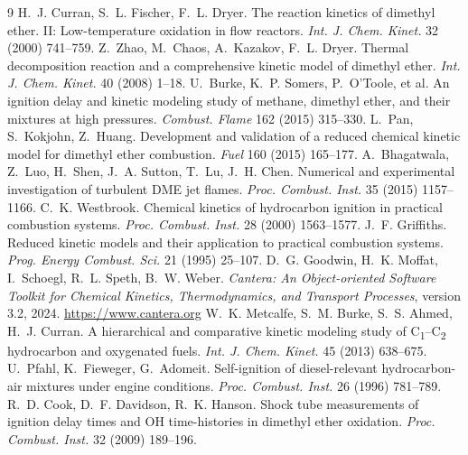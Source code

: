\documentclass[11pt,a4paper]{article}
\begin{document}
\begin{thebibliography}{9}
 H.~J. Curran, S.~L. Fischer, F.~L. Dryer. The reaction
kinetics of dimethyl ether. II: Low-temperature oxidation in flow reactors.
\emph{Int. J. Chem. Kinet.} 32 (2000) 741--759.
 Z.~Zhao, M.~Chaos, A.~Kazakov, F.~L. Dryer. Thermal
decomposition reaction and a comprehensive kinetic model of dimethyl ether.
\emph{Int. J. Chem. Kinet.} 40 (2008) 1--18.
 U.~Burke, K.~P. Somers, P.~O'Toole, et al. An ignition delay
and kinetic modeling study of methane, dimethyl ether, and their mixtures at high
pressures. \emph{Combust. Flame} 162 (2015) 315--330.
 L.~Pan, S.~Kokjohn, Z.~Huang. Development and validation of a
reduced chemical kinetic model for dimethyl ether combustion. \emph{Fuel} 160
(2015) 165--177.
 A.~Bhagatwala, Z.~Luo, H.~Shen, J.~A. Sutton, T.~Lu,
J.~H. Chen. Numerical and experimental investigation of turbulent DME jet flames.
\emph{Proc. Combust. Inst.} 35 (2015) 1157--1166.
 C.~K. Westbrook. Chemical kinetics of hydrocarbon
ignition in practical combustion systems. \emph{Proc. Combust. Inst.} 28 (2000)
1563--1577.
 J.~F. Griffiths. Reduced kinetic models and their
application to practical combustion systems. \emph{Prog. Energy Combust. Sci.} 21
(1995) 25--107.
 D.~G. Goodwin, H.~K. Moffat, I.~Schoegl, R.~L. Speth,
B.~W. Weber. \emph{Cantera: An Object-oriented Software Toolkit for Chemical
Kinetics, Thermodynamics, and Transport Processes}, version 3.2, 2024.
\url{https://www.cantera.org}
 W.~K. Metcalfe, S.~M. Burke, S.~S. Ahmed, H.~J. Curran. A
hierarchical and comparative kinetic modeling study of
C\textsubscript{1}--C\textsubscript{2} hydrocarbon and oxygenated fuels.
\emph{Int. J. Chem. Kinet.} 45 (2013) 638--675.
 U.~Pfahl, K.~Fieweger, G.~Adomeit. Self-ignition of
diesel-relevant hydrocarbon-air mixtures under engine conditions.
\emph{Proc. Combust. Inst.} 26 (1996) 781--789.
 R.~D. Cook, D.~F. Davidson, R.~K. Hanson. Shock tube
measurements of ignition delay times and OH time-histories in dimethyl ether
oxidation. \emph{Proc. Combust. Inst.} 32 (2009) 189--196.
\end{thebibliography}
\end{document}
